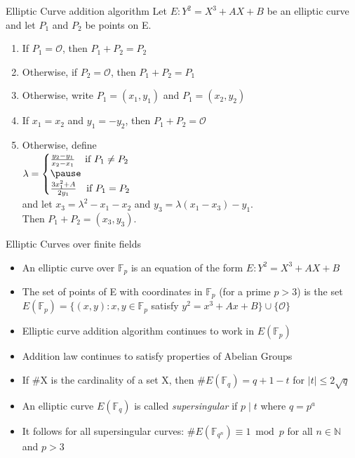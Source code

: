 \documentclass[handout]{beamer}
\begin{document}
\begin{frame}{Elliptic Curve addition algorithm}
	Let $E : Y^2 = X^3 + AX + B$ be an elliptic curve and let $P_1$ and $P_2$ be points on E.
	\begin{enumerate}[1.]
		\item If $P_1 = \mathcal{O}$, then $P_1 + P_2 = P_2$\pause
		\item Otherwise, if $P_2=\mathcal{O}$, then $P_1 + P_2 = P_1$\pause
		\item Otherwise, write $P_1 = (x_1,y_1)$ and $P_1 = (x_2,y_2)$\pause
		\item If $x_1 = x_2$ and $y_1=-y_2$, then $P_1+P_2=\mathcal{O}$\pause
		\item Otherwise, define \\
		\qquad \qquad \qquad$\lambda =
		\begin{cases}
			\frac{y_2-y_1}{x_2-x_1}\text{\quad if }P_1 \neq P_2\\\pause
			\\
			\frac{3x_1^2 +A}{2y_1}\text{\quad if }P_1=P_2 
		\end{cases}$\\\pause
		\vspace{5mm}
		and let $x_3=\lambda^2-x_1-x_2$  \hfill and $y_3=\lambda(x_1-x_3)-y_1$.\\
		\vfill
		Then $P_1+P_2=(x_3,y_3)$.
	\end{enumerate}
\end{frame}


\begin{frame}{Elliptic Curves over finite fields}
	\begin{itemize}[\textbullet]
		\item An elliptic curve over $\mathbb{F}_p$ is an equation of the form $E:Y^2=X^3+AX+B$\pause
		\item The set of points of E with coordinates in $\mathbb{F}_p$ (for a prime $p>3$) is the set $E(\mathbb{F}_p)=\{(x,y):x,y\in \mathbb{F}_p$ satisfy $y^2=x^3+Ax+B \} \cup \{\mathcal{O}\}$\pause
		\item Elliptic curve addition algorithm continues to work in $E(\mathbb{F}_p)$\pause
		\item Addition law continues to satisfy properties of Abelian Groups\pause
		\item If \#X is the cardinality of a set X, then \#$E(\mathbb{F}_q) = q+1-t$ for $|t|\leq 2\sqrt{q}$\pause
		\item An elliptic curve $E(\mathbb{F}_q)$ is called \textit{supersingular} if $p \mid t$ where $q=p^a$\pause
		\item It follows for all supersingular curves: $\#E(\mathbb{F}_{q^n})\equiv 1 \bmod p$ for all $n\in \mathbb{N}$ and $p>3$ %
	\end{itemize}
	
\end{frame}
\end{document}
